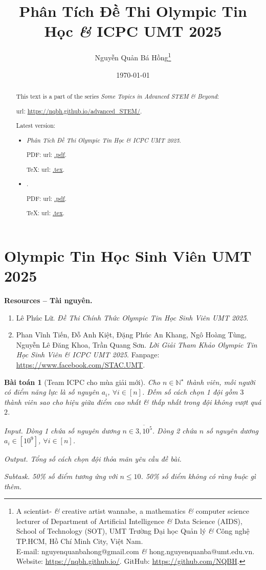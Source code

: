 \documentclass{article}
\title{Phân Tích Đề Thi Olympic Tin Học {\it\&} ICPC UMT 2025}
\author{Nguyễn Quản Bá Hồng\footnote{A scientist- {\it\&} creative artist wannabe, a mathematics {\it\&} computer science lecturer of Department of Artificial Intelligence {\it\&} Data Science (AIDS), School of Technology (SOT), UMT Trường Đại học Quản lý {\it\&} Công nghệ TP.HCM, Hồ Chí Minh City, Việt Nam.\\E-mail: {\sf nguyenquanbahong@gmail.com} {\it\&} {\sf hong.nguyenquanba@umt.edu.vn}. Website: \url{https://nqbh.github.io/}. GitHub: \url{https://github.com/NQBH}.}}
\date{\today}
\newtheorem{baitoan}{Bài toán}
\begin{document}
\maketitle
\begin{abstract}
    This text is a part of the series {\it Some Topics in Advanced STEM \& Beyond}:
    
    {\sc url}: \url{https://nqbh.github.io/advanced_STEM/}.
    
    Latest version:
    \begin{itemize}
        \item {\it Phân Tích Đề Thi Olympic Tin Học \& ICPC UMT 2025}.
        
        PDF: {\sc url}: \url{.pdf}.
        
        \TeX: {\sc url}: \url{.tex}.
        \item {\it }.
        
        PDF: {\sc url}: \url{.pdf}.
        
        \TeX: {\sc url}: \url{.tex}.
    \end{itemize}
\end{abstract}
\tableofcontents


\section{Olympic Tin Học Sinh Viên UMT 2025}
\textbf{\textsf{Resources -- Tài nguyên.}}
\begin{enumerate}
    \item {\sc Lê Phúc Lữ}. {\it Đề Thi Chính Thức Olympic Tin Học Sinh Viên UMT 2025}.
    
    \item {\sc Phan Vĩnh Tiến, Đỗ Anh Kiệt, Đặng Phúc An Khang, Ngô Hoàng Tùng, Nguyễn Lê Đăng Khoa, Trần Quang Sơn}. {\it Lời Giải Tham Khảo Olympic Tin Học Sinh Viên \& ICPC UMT 2025}. Fanpage: \url{https://www.facebook.com/STAC.UMT}.
\end{enumerate}

\begin{baitoan}[Team ICPC cho mùa giải mới]
    Cho $n\in\mathbb{N}^\star$ thành viên, mỗi người có điểm năng lực là số nguyên $a_i$, $\forall i\in[n]$. Đếm số cách chọn 1 đội gồm $3$ thành viên sao cho hiệu giữa điểm cao nhất \& thấp nhất trong đội không vượt quá $2$.
    \item {\sf Input.} Dòng 1 chứa số nguyên dương $n\in\overline{3,10^5}$. Dòng 2 chứa $n$ số nguyên dương $a_i\in[10^9]$, $\forall i\in[n]$.
    \item {\sf Output.} Tổng số cách chọn đội thỏa mãn yêu cầu đề bài.
    \item {\sf Subtask.} 50\% số điểm tương ứng với $n\le10$. 50\% số điểm không có ràng buộc gì thêm.
\end{baitoan}
\end{document}
